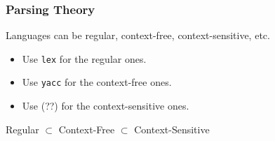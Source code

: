 \newcommand{\regex}[1]{

\vspace{\fill}

\begin{center}

\Large\texttt{/#1/}

\end{center}

\vspace{\fill}

}


\begin{frame}

\frametitle{Parsing Theory}

\vspace{\fill}

\begin{center}

Languages can be regular, context-free, context-sensitive, etc.

\end{center}

\vspace{\fill}

\pause

\begin{itemize}

\item Use \texttt{lex} for the regular ones.

\pause

\item Use \texttt{yacc} for the context-free ones.

\pause

\item Use (??) for the context-sensitive ones.

\end{itemize}

\pause

\vspace{\fill}

\begin{center}

Regular $\subset$ Context-Free $\subset$ Context-Sensitive

\end{center}

\vspace{\fill}

\end{frame}


